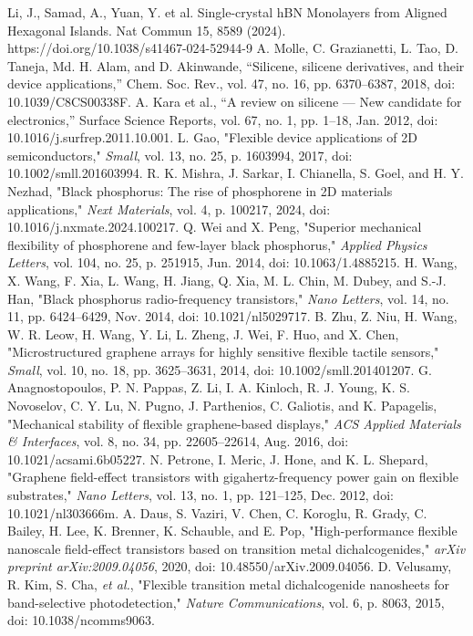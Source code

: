 \documentclass[conference]{IEEEtran}
\begin{document}
\begin{thebibliography}{00}
 Li, J., Samad, A., Yuan, Y. et al. Single-crystal hBN Monolayers from Aligned Hexagonal Islands. Nat Commun 15, 8589 (2024). https://doi.org/10.1038/s41467-024-52944-9
 A. Molle, C. Grazianetti, L. Tao, D. Taneja, Md. H. Alam, and D. Akinwande, “Silicene, silicene derivatives, and their device applications,” Chem. Soc. Rev., vol. 47, no. 16, pp. 6370–6387, 2018, doi: 10.1039/C8CS00338F.
 A. Kara et al., “A review on silicene — New candidate for electronics,” Surface Science Reports, vol. 67, no. 1, pp. 1–18, Jan. 2012, doi: 10.1016/j.surfrep.2011.10.001.
 L. Gao, "Flexible device applications of 2D semiconductors," \textit{Small}, vol. 13, no. 25, p. 1603994, 2017, doi: 10.1002/smll.201603994.
 R. K. Mishra, J. Sarkar, I. Chianella, S. Goel, and H. Y. Nezhad, "Black phosphorus: The rise of phosphorene in 2D materials applications," \textit{Next Materials}, vol. 4, p. 100217, 2024, doi: 10.1016/j.nxmate.2024.100217.
 Q. Wei and X. Peng, "Superior mechanical flexibility of phosphorene and few-layer black phosphorus," \textit{Applied Physics Letters}, vol. 104, no. 25, p. 251915, Jun. 2014, doi: 10.1063/1.4885215.
 H. Wang, X. Wang, F. Xia, L. Wang, H. Jiang, Q. Xia, M. L. Chin, M. Dubey, and S.-J. Han, "Black phosphorus radio-frequency transistors," \textit{Nano Letters}, vol. 14, no. 11, pp. 6424–6429, Nov. 2014, doi: 10.1021/nl5029717.
 B. Zhu, Z. Niu, H. Wang, W. R. Leow, H. Wang, Y. Li, L. Zheng, J. Wei, F. Huo, and X. Chen, "Microstructured graphene arrays for highly sensitive flexible tactile sensors," \textit{Small}, vol. 10, no. 18, pp. 3625–3631, 2014, doi: 10.1002/smll.201401207.
 G. Anagnostopoulos, P. N. Pappas, Z. Li, I. A. Kinloch, R. J. Young, K. S. Novoselov, C. Y. Lu, N. Pugno, J. Parthenios, C. Galiotis, and K. Papagelis, "Mechanical stability of flexible graphene-based displays," \textit{ACS Applied Materials \& Interfaces}, vol. 8, no. 34, pp. 22605–22614, Aug. 2016, doi: 10.1021/acsami.6b05227.
 N. Petrone, I. Meric, J. Hone, and K. L. Shepard, "Graphene field-effect transistors with gigahertz-frequency power gain on flexible substrates," \textit{Nano Letters}, vol. 13, no. 1, pp. 121–125, Dec. 2012, doi: 10.1021/nl303666m.
 A. Daus, S. Vaziri, V. Chen, C. Koroglu, R. Grady, C. Bailey, H. Lee, K. Brenner, K. Schauble, and E. Pop, "High-performance flexible nanoscale field-effect transistors based on transition metal dichalcogenides," \textit{arXiv preprint arXiv:2009.04056}, 2020, doi: 10.48550/arXiv.2009.04056.
 D. Velusamy, R. Kim, S. Cha, \textit{et al.}, "Flexible transition metal dichalcogenide nanosheets for band-selective photodetection," \textit{Nature Communications}, vol. 6, p. 8063, 2015, doi: 10.1038/ncomms9063.
\end{thebibliography}
\end{document}
